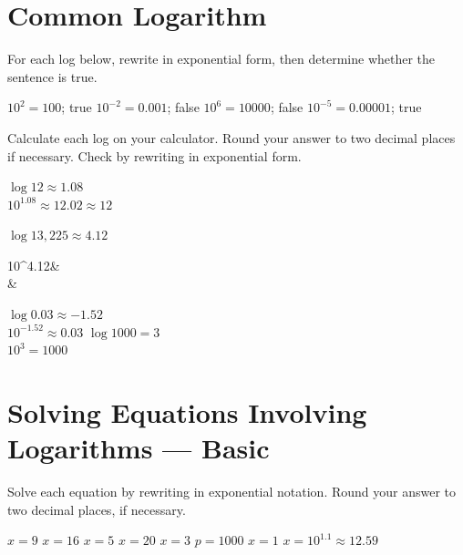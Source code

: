 \section*{Common Logarithm}
For each log below, rewrite in exponential form, then determine whether the sentence is true.
\begin{smenum}
\mitemxxxx
{$10^2=100$; true}
{$10^{-2}=0.001$; false}
{$10^6=10000$; false}
{$10^{-5}=0.00001$; true}
\end{smenum}
Calculate each log on your calculator. Round your answer to two decimal places if necessary. Check by rewriting in exponential form.
\begin{smenum}
\mitemxxxx
{$\log 12\approx 1.08$\\$10^{1.08}\approx 12.02\approx 12$}
{$\log 13,225\approx 4.12$\\\begin{amath}10^{4.12}&\\&\end{amath}}
{$\log 0.03\approx -1.52$\\$10^{-1.52}\approx 0.03$}
{$\log 1000=3$\\$10^3=1000$}
\end{smenum}

\section*{Solving Equations Involving Logarithms --- Basic}
Solve each equation by rewriting in exponential notation.  Round your answer to two decimal places, if necessary.
\begin{smenum}
\mitemxxxx
{$x=9$}
{$x=16$}
{$x=5$}
{$x=20$}
\mitemxxxx
{$x=3$}
{$p=1000$}
{$x=1$}
{$x=10^{1.1}\approx 12.59$}
\end{smenum}

